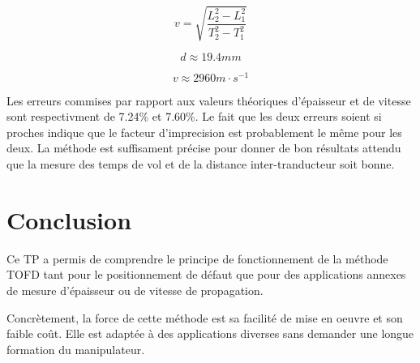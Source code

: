 \begin{equation}
	v = \sqrt{\frac{L_2^2 - L_1^2}{T_2^2 - T_1^2}} \label{tofd:kim_v}
\end{equation}

\begin{equation}
	d \approx 19.4mm \label{tofd:result_d}
\end{equation}

\begin{equation}
	v \approx 2960 m\cdot s^{-1} \label{tofd:result_v}
\end{equation}

Les erreurs commises par rapport aux valeurs théoriques d'épaisseur et de vitesse sont
respectivment de 7.24\% et 7.60\%. Le fait que les deux erreurs soient si proches indique
que le facteur d'imprecision est probablement le même pour les deux. La méthode est
suffisament précise pour donner de bon résultats attendu que la mesure des temps de vol et
de la distance inter-tranducteur soit bonne.

\section*{Conclusion}

Ce TP a permis de comprendre le principe de fonctionnement de la méthode TOFD tant pour le
positionnement de défaut que pour des applications annexes de mesure d'épaisseur ou de
vitesse de propagation.

Concrètement, la force de cette méthode est sa facilité de mise en oeuvre et son faible
coût. Elle est adaptée à des applications diverses sans demander une longue formation du
manipulateur.
